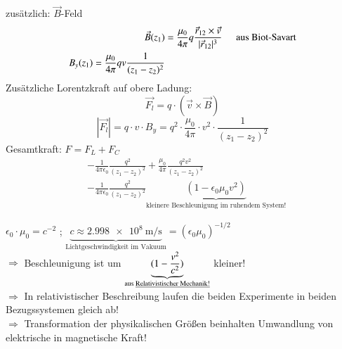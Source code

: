 zusätzlich: $ \vec{B} $-Feld
\begin{align*}
	\vec{B}(z_1) &= \frac{\mu_0}{4\pi}q\frac{\vec{r}_{12} \times \vec{v}}{| \vec{r}_{12} |^3} \hspace{5mm} \text{aus Biot-Savart} \\
	B_y(z_1) = \frac{\mu_0}{4\pi}qv\frac{1}{( z_1-z_2 )^2}
\end{align*}
Zusätzliche Lorentzkraft auf obere Ladung: \\
$$ \vec{F_l} = q \cdot (\vec{v}\times \vec{B}) $$
$$ |\vec{F_l}| = q \cdot v \cdot B_y = q^2 \cdot \frac{\mu_0}{4\pi} \cdot v^2 \cdot \frac{1}{(z_1-z_2)^2} $$
Gesamtkraft: $ F=F_L+F_C $
\begin{align*}
&-\frac{1}{4\pi\epsilon_0} \frac{q^2}{(z_1-z_2)^2} + \frac{\mu_0}{4\pi} \frac{q^2v^2}{(z_1-z_2)^2}\\
&-\frac{1}{4\pi\epsilon_0} \frac{q^2}{(z_1-z_2)^2} \underbrace{(1-\epsilon_0\mu_0v^2)}_{\text{kleinere Beschleunigung im ruhendem System!}}
\end{align*}

$ \epsilon_0 \cdot \mu_0 = c^{-2}$ ; $  \underbrace{c \approx \SI{2,998e8}{\meter\per\second}}_{\text{Lichtgeschwindigkeit im Vakuum}} = (\epsilon_0\mu_0)^{-1/2} $ \\
$ \Rightarrow $ Beschleunigung ist um $ \underbrace{( 1-\frac{v^2}{c^2} )}_{\text{aus \underline{Relativistischer Mechanik!}}} $ kleiner!\\
$ \Rightarrow $ In relativistischer Beschreibung laufen die beiden Experimente in beiden Bezugssystemen gleich ab! \\
$ \Rightarrow $ Transformation der physikalischen Größen beinhalten Umwandlung von elektrische in magnetische Kraft!